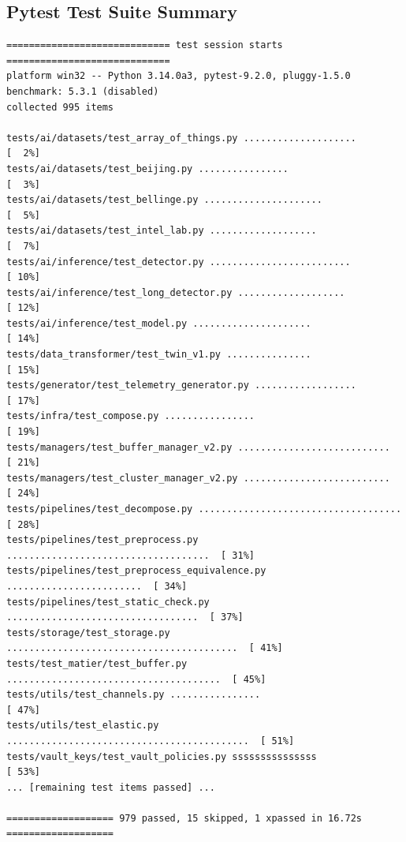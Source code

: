 \documentclass[10pt,a4paper]{report}
\begin{document}
\subsection{Pytest Test Suite Summary}
\begin{lstlisting}
============================= test session starts =============================
platform win32 -- Python 3.14.0a3, pytest-9.2.0, pluggy-1.5.0
benchmark: 5.3.1 (disabled)
collected 995 items

tests/ai/datasets/test_array_of_things.py ....................          [  2%]
tests/ai/datasets/test_beijing.py ................                       [  3%]
tests/ai/datasets/test_bellinge.py .....................                 [  5%]
tests/ai/datasets/test_intel_lab.py ...................                  [  7%]
tests/ai/inference/test_detector.py .........................            [ 10%]
tests/ai/inference/test_long_detector.py ...................             [ 12%]
tests/ai/inference/test_model.py .....................                   [ 14%]
tests/data_transformer/test_twin_v1.py ...............                  [ 15%]
tests/generator/test_telemetry_generator.py ..................           [ 17%]
tests/infra/test_compose.py ................                             [ 19%]
tests/managers/test_buffer_manager_v2.py ...........................     [ 21%]
tests/managers/test_cluster_manager_v2.py ..........................    [ 24%]
tests/pipelines/test_decompose.py ....................................   [ 28%]
tests/pipelines/test_preprocess.py ....................................  [ 31%]
tests/pipelines/test_preprocess_equivalence.py ........................  [ 34%]
tests/pipelines/test_static_check.py ..................................  [ 37%]
tests/storage/test_storage.py .........................................  [ 41%]
tests/test_matier/test_buffer.py ......................................  [ 45%]
tests/utils/test_channels.py ................                            [ 47%]
tests/utils/test_elastic.py ...........................................  [ 51%]
tests/vault_keys/test_vault_policies.py sssssssssssssss                  [ 53%]
... [remaining test items passed] ...

=================== 979 passed, 15 skipped, 1 xpassed in 16.72s ===================
\end{lstlisting}
\end{document}
